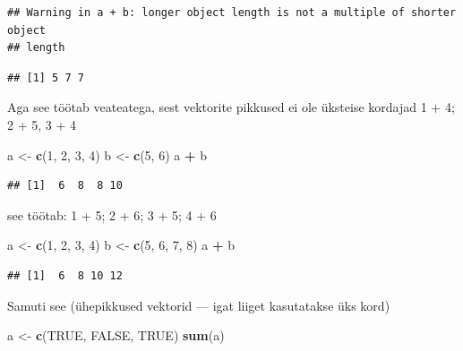 \documentclass[]{book}
\newenvironment{Shaded}{\begin{snugshade}}{\end{snugshade}}
\newcommand{\KeywordTok}[1]{\textcolor[rgb]{0.13,0.29,0.53}{\textbf{#1}}}
\newcommand{\DecValTok}[1]{\textcolor[rgb]{0.00,0.00,0.81}{#1}}
\newcommand{\StringTok}[1]{\textcolor[rgb]{0.31,0.60,0.02}{#1}}
\newcommand{\OtherTok}[1]{\textcolor[rgb]{0.56,0.35,0.01}{#1}}
\newcommand{\OperatorTok}[1]{\textcolor[rgb]{0.81,0.36,0.00}{\textbf{#1}}}
\newcommand{\NormalTok}[1]{#1}
\begin{document}
\begin{verbatim}
## Warning in a + b: longer object length is not a multiple of shorter object
## length
\end{verbatim}

\begin{verbatim}
## [1] 5 7 7
\end{verbatim}

Aga see töötab veateatega, sest vektorite pikkused ei ole üksteise
kordajad 1 + 4; 2 + 5, 3 + 4

\begin{Shaded}
\begin{Highlighting}[]
\NormalTok{a <-}\StringTok{ }\KeywordTok{c}\NormalTok{(}\DecValTok{1}\NormalTok{, }\DecValTok{2}\NormalTok{, }\DecValTok{3}\NormalTok{, }\DecValTok{4}\NormalTok{)}
\NormalTok{b <-}\StringTok{ }\KeywordTok{c}\NormalTok{(}\DecValTok{5}\NormalTok{, }\DecValTok{6}\NormalTok{) }
\NormalTok{a }\OperatorTok{+}\StringTok{ }\NormalTok{b}
\end{Highlighting}
\end{Shaded}

\begin{verbatim}
## [1]  6  8  8 10
\end{verbatim}

see töötab: 1 + 5; 2 + 6; 3 + 5; 4 + 6

\begin{Shaded}
\begin{Highlighting}[]
\NormalTok{a <-}\StringTok{ }\KeywordTok{c}\NormalTok{(}\DecValTok{1}\NormalTok{, }\DecValTok{2}\NormalTok{, }\DecValTok{3}\NormalTok{, }\DecValTok{4}\NormalTok{)}
\NormalTok{b <-}\StringTok{ }\KeywordTok{c}\NormalTok{(}\DecValTok{5}\NormalTok{, }\DecValTok{6}\NormalTok{, }\DecValTok{7}\NormalTok{, }\DecValTok{8}\NormalTok{) }
\NormalTok{a }\OperatorTok{+}\StringTok{ }\NormalTok{b}
\end{Highlighting}
\end{Shaded}

\begin{verbatim}
## [1]  6  8 10 12
\end{verbatim}

Samuti see (ühepikkused vektorid --- igat liiget kasutatakse üks kord)

\begin{Shaded}
\begin{Highlighting}[]
\NormalTok{a <-}\StringTok{ }\KeywordTok{c}\NormalTok{(}\OtherTok{TRUE}\NormalTok{, }\OtherTok{FALSE}\NormalTok{, }\OtherTok{TRUE}\NormalTok{)}
\KeywordTok{sum}\NormalTok{(a)}
\end{Highlighting}
\end{Shaded}
\end{document}
